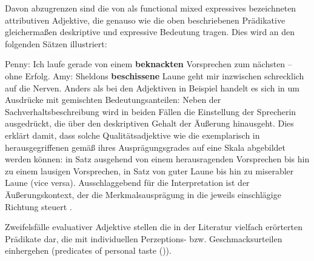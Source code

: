 Davon abzugrenzen sind die von \citet[]{Gutzmann.2013a} als \glqq{}functional mixed expressives\grqq{} bezeichneten attributiven Adjektive, die genauso wie die oben beschriebenen Prädikative gleichermaßen deskriptive und expressive Bedeutung tragen. Dies wird an den folgenden Sätzen illustriert:

\ea  \label{ExAd1b}
  \ea Penny: \glqq{}Ich laufe gerade von einem \textbf{beknackten} Vorsprechen zum nächsten -- ohne Erfolg.\grqq{} \label{penn1}
   \ex Amy: \glqq{}Sheldons \textbf{beschissene} Laune geht mir inzwischen schrecklich auf die Nerven.\grqq{} \label{amy1b}
 \z
 \z
Anders als bei den Adjektiven in Beispiel  handelt es sich in  um Ausdrücke mit gemischten Bedeutungsanteilen: Neben der Sachverhaltsbeschreibung wird in beiden Fällen die Einstellung der Sprecherin ausgedrückt, die über den deskriptiven Gehalt der Äußerung hinausgeht. Dies erklärt {\citet[84f.]{Gutzmann.2019a}} damit, dass solche Qualitätsadjektive wie die exemplarisch in  herausgegriffenen gemäß ihres Ausprägungsgrades auf eine Skala abgebildet werden können: in Satz  ausgehend von einem herausragenden Vorsprechen bis hin zu einem lausigen Vorsprechen, in Satz  von guter Laune bis hin zu miserabler Laune (vice versa). Ausschlaggebend für die Interpretation ist der Äußerungskontext, der die Merkmalsausprägung in die jeweils einschlägige Richtung steuert {\citep[vgl.][85]{Gutzmann.2019a}}.

Zweifelsfälle evaluativer Adjektive stellen die in der Literatur vielfach erörterten Prädikate dar, die mit individuellen Perzeptions- bzw. Geschmacksurteilen einhergehen (\glqq{}predicates of personal taste\grqq{} ({\citealt[]{Lasersohn.2005}})).

